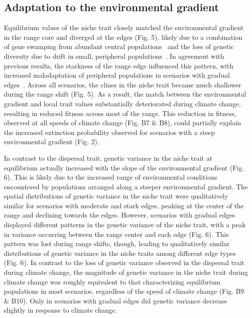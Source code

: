 \documentclass[11pt]{article}
\begin{document}
\subsection*{Adaptation to the environmental gradient} 
Equilibrium values of the niche trait closely matched the environmental gradient in the range core and diverged at the edges (Fig. 5), likely due to a combination of gene swamping from abundant central populations~\citep{kirkpatrick1997evolution} and the loss of genetic diversity due to drift in small, peripheral populations~\citep{polechova2018sky, polechova2015limits}. In agreement with previous results, the starkness of the range edge influenced this pattern, with increased maladaptation of peripheral populations in scenarios with gradual edges~\citep{garcia1997genetic}. Across all scenarios, the clines in the niche trait became much shallower during the range shift (Fig. 5). As a result, the match between the environmental gradient and local trait values substantially deteriorated during climate change, resulting in reduced fitness across most of the range. This reduction in fitness, observed at all speeds of climate change (Fig. B7 \& B8), could partially explain the increased extinction probability observed for scenarios with a steep environmental gradient (Fig. 2). 

In contrast to the dispersal trait, genetic variance in the niche trait at equilibrium actually increased with the slope of the environmental gradient (Fig. 6). This is likely due to the increased range of environmental conditions encountered by populations arranged along a steeper environmental gradient. The spatial distributions of genetic variance in the niche trait were qualitatively similar for scenarios with moderate and stark edges, peaking at the center of the range and declining towards the edges. However, scenarios with gradual edges displayed different patterns in the genetic variance of the niche trait, with a peak in variance occurring between the range center and each edge (Fig. 6). This pattern was lost during range shifts, though, leading to qualitatively similar distributions of genetic variance in the niche traits among different edge types (Fig. 6). In contrast to the loss of genetic variance observed in the dispersal trait during climate change, the magnitude of genetic variance in the niche trait during climate change was roughly equivalent to that characterizing equilibrium populations in most scenarios, regardless of the speed of climate change (Fig. B9 \& B10). Only in scenarios with gradual edges did genetic variance decrease slightly in response to climate change.
\end{document}
